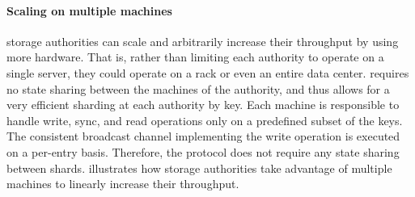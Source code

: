 \paragraph{Scaling on multiple machines}
storage authorities can scale and arbitrarily increase their throughput by using more hardware. That is, rather than limiting each authority to operate on a single server, they could operate on a rack or even an entire data center.
%
\sysname requires no state sharing between the machines of the authority, and thus allows for a very efficient sharding at each authority by key. Each machine is responsible to handle write, sync, and read operations only on a predefined subset of the keys. The consistent broadcast channel implementing the write operation is executed on a per-entry basis. Therefore, the protocol does not require any state sharing between shards.  illustrates how storage authorities take advantage of multiple machines to linearly increase their throughput.
